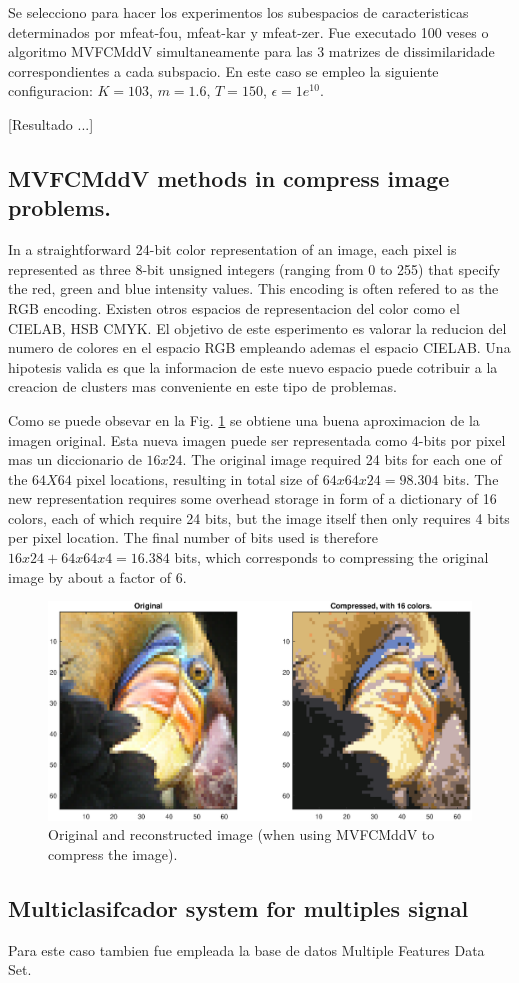 \documentclass[12pt]{article}
\begin{document}
Se selecciono para hacer los experimentos los subespacios de caracteristicas determinados por mfeat-fou, mfeat-kar y mfeat-zer. Fue executado 100 veses o algoritmo MVFCMddV simultaneamente para las 3 matrizes de dissimilaridade correspondientes a cada subspacio. En este caso se empleo la siguiente configuracion: $K =103$, $m = 1.6$, $T = 150$, $\epsilon = 1e^{10}$.


[Resultado ...]


\subsection{MVFCMddV methods in compress image problems.}

In a straightforward 24-bit color representation of an image, each pixel is represented as three 8-bit unsigned integers (ranging from 0 to 255) that specify the red, green and blue intensity values. This encoding is often refered to as the RGB encoding. Existen otros espacios de representacion del color como el CIELAB, HSB CMYK. El objetivo de este esperimento es valorar la reducion del numero de colores en el espacio RGB empleando ademas el espacio CIELAB. Una hipotesis valida es que la informacion de este nuevo espacio puede cotribuir a la creacion de clusters mas conveniente en este tipo de problemas.  

Como se puede obsevar en la Fig. \ref{fig:image_compress} se obtiene una buena aproximacion de la imagen original. Esta nueva imagen puede ser representada como 4-bits por pixel mas un diccionario de $16x24$. The original image required 24 bits for each one of the $64X64$ pixel locations, resulting in total size of $64x64x24 = 98.304$ bits. The new representation requires some overhead storage in form of a dictionary of 16 colors, each of which require 24 bits, but the image itself then only requires 4 bits per pixel location. The final number of bits used is therefore $16x24 + 64x64x4 = 16.384$ bits, which corresponds to compressing the original image by about a factor of 6.


\begin{figure}[h]
\centering
\includegraphics[width=5.5in]{../out/image-compress-16.eps}
\caption{Original and reconstructed image (when using MVFCMddV to compress the image).}
\label{fig:image_compress}
\end{figure}  


\subsection{Multiclasifcador system for multiples signal}

Para este caso tambien fue empleada la base de datos Multiple Features Data Set. 
\end{document}
